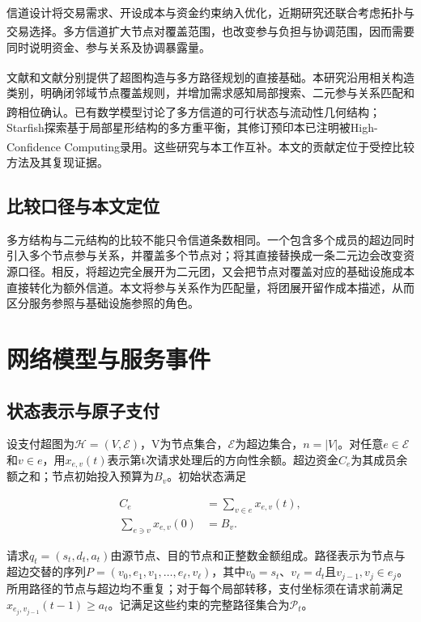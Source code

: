 \documentclass[UTF8,a4paper,twocolumn,fontset=none,zihao=5]{ctexart}
\newcommand{\upcite}[1]{\textsuperscript{\cite{#1}}}
\begin{document}
信道设计将交易需求、开设成本与资金约束纳入优化\upcite{r6,r7,r8}，近期研究还联合考虑拓扑与交易选择\upcite{r13}。多方信道扩大节点对覆盖范围，也改变参与负担与协调范围\upcite{r10}，因而需要同时说明资金、参与关系及协调暴露量。


文献\upcite{r10}和文献\upcite{r11}分别提供了超图构造与多方路径规划的直接基础。本研究沿用相关构造类别，明确闭邻域节点覆盖规则，并增加需求感知局部搜索、二元参与关系匹配和跨相位确认。已有数学模型讨论了多方信道的可行状态与流动性几何结构\upcite{r14}；Starfish探索基于局部星形结构的多方重平衡，其修订预印本已注明被High-Confidence Computing录用\upcite{r15}。这些研究与本工作互补。本文的贡献定位于受控比较方法及其复现证据。


\subsection{比较口径与本文定位}

多方结构与二元结构的比较不能只令信道条数相同。一个包含多个成员的超边同时引入多个节点参与关系，并覆盖多个节点对；将其直接替换成一条二元边会改变资源口径。相反，将超边完全展开为二元团，又会把节点对覆盖对应的基础设施成本直接转化为额外信道。本文将参与关系作为匹配量，将团展开留作成本描述，从而区分服务参照与基础设施参照的角色。


\section{网络模型与服务事件}

\subsection{状态表示与原子支付}

设支付超图为$\mathcal H=(V,\mathcal E)$，V为节点集合，$\mathcal E$为超边集合，$n=|V|$。对任意$e\in\mathcal E$和$v\in e$，用$x_{e,v}(t)$表示第t次请求处理后的方向性余额。超边资金$C_e$为其成员余额之和；节点初始投入预算为$B_v$。初始状态满足



\begin{equation}
\begin{aligned} C_e&=\sum_{v\in e}x_{e,v}(t),\\ \sum_{e\ni v}x_{e,v}(0)&=B_v.\end{aligned}
\label{eq:1}\end{equation}


请求$q_t=(s_t,d_t,a_t)$由源节点、目的节点和正整数金额组成。路径表示为节点与超边交替的序列$P=(v_0,e_1,v_1,\ldots,e_\ell,v_\ell)$，其中$v_0=s_t$、$v_\ell=d_t$且$v_{j-1},v_j\in e_j$。所用路径的节点与超边均不重复；对于每个局部转移，支付坐标须在请求前满足$x_{e_j,v_{j-1}}(t-1)\geq a_t$。记满足这些约束的完整路径集合为$\mathcal P_t$。
\end{document}
